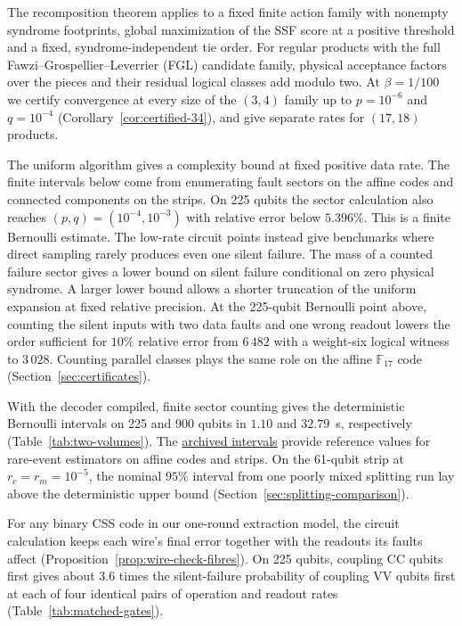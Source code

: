 \documentclass[10pt,twocolumn]{article}
\theoremstyle{definition}
\begin{document}
The recomposition theorem applies to a fixed finite action family
with nonempty syndrome footprints, global maximization of the SSF
score at a positive threshold and a fixed, syndrome-independent tie
order. For regular products with the
full Fawzi--Grospellier--Leverrier (FGL) candidate family, physical
acceptance factors over the pieces and their residual logical classes
add modulo two. At $\beta=1/100$ we certify convergence at every size
of the $(3,4)$ family up to $p=10^{-6}$ and $q=10^{-4}$
(Corollary~\ref{cor:certified-34}), and give separate rates for
$(17,18)$ products.

The uniform algorithm gives a complexity bound at fixed positive data
rate. The finite intervals below come from enumerating fault sectors on
the affine codes and connected components on the strips. On 225 qubits
the sector calculation also reaches $(p,q)=(10^{-4},10^{-3})$ with
relative error below $5.396\%$. This is a finite Bernoulli estimate.
The low-rate circuit points instead give benchmarks where direct
sampling rarely produces even one silent failure.
The mass of a counted failure sector gives a lower bound on silent
failure conditional on zero physical syndrome. A larger lower bound
allows a shorter truncation of the uniform expansion at fixed relative
precision. At the 225-qubit
Bernoulli point above, counting the silent inputs with two data faults
and one wrong readout lowers the order sufficient for $10\%$ relative
error from $6\,482$ with a weight-six logical witness to $3\,028$. Counting parallel classes plays the
same role on the affine $\mathbb F_{17}$ code
(Section~\ref{sec:certificates}).

With the decoder compiled, finite sector counting gives the deterministic
Bernoulli intervals on 225 and 900 qubits in $1.10$ and $32.79$~s, respectively
(Table~\ref{tab:two-volumes}). The
\href{https://doi.org/10.5281/zenodo.24548710}{archived intervals}
provide reference values for rare-event estimators on affine codes
and strips. On the 61-qubit strip at $r_c=r_m=10^{-5}$, the nominal
$95\%$ interval from one poorly mixed splitting run lay above the
deterministic upper bound (Section~\ref{sec:splitting-comparison}).

For any binary CSS code in our one-round extraction model, the
circuit calculation keeps each wire's final error together with the
readouts its faults affect (Proposition~\ref{prop:wire-check-fibres}).
On 225 qubits, coupling CC qubits first gives about $3.6$ times the
silent-failure probability of coupling VV qubits first at each of
four identical pairs of operation and readout rates
(Table~\ref{tab:matched-gates}).
\end{document}
